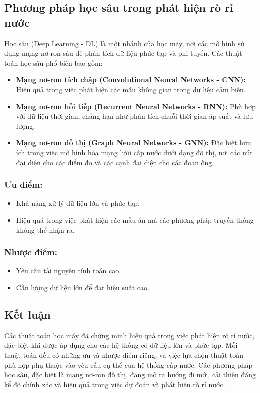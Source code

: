 \subsection{Phương pháp học sâu trong phát hiện rò rỉ nước}
Học sâu (Deep Learning - DL) là một nhánh của học máy, nơi các mô hình sử dụng mạng nơ-ron sâu để phân tích dữ liệu phức tạp và phi tuyến. Các thuật toán học sâu phổ biến bao gồm:
\begin{itemize}
    \item \textbf{Mạng nơ-ron tích chập (Convolutional Neural Networks - CNN):} Hiệu quả trong việc phát hiện các mẫu không gian trong dữ liệu cảm biến.
    \item \textbf{Mạng nơ-ron hồi tiếp (Recurrent Neural Networks - RNN):} Phù hợp với dữ liệu thời gian, chẳng hạn như phân tích chuỗi thời gian áp suất và lưu lượng.
    \item \textbf{Mạng nơ-ron đồ thị (Graph Neural Networks - GNN):} Đặc biệt hữu ích trong việc mô hình hóa mạng lưới cấp nước dưới dạng đồ thị, nơi các nút đại diện cho các điểm đo và các cạnh đại diện cho các đoạn ống.
\end{itemize}

\subsubsection{Ưu điểm:}
\begin{itemize}
    \item Khả năng xử lý dữ liệu lớn và phức tạp.
    \item Hiệu quả trong việc phát hiện các mẫu ẩn mà các phương pháp truyền thống không thể nhận ra.
\end{itemize}

\subsubsection{Nhược điểm:}
\begin{itemize}
    \item Yêu cầu tài nguyên tính toán cao.
    \item Cần lượng dữ liệu lớn để đạt hiệu suất cao.
\end{itemize}

\subsection{Kết luận}
Các thuật toán học máy đã chứng minh hiệu quả trong việc phát hiện rò rỉ nước, đặc biệt khi được áp dụng cho các hệ thống có dữ liệu lớn và phức tạp. Mỗi thuật toán đều có những ưu và nhược điểm riêng, và việc lựa chọn thuật toán phù hợp phụ thuộc vào yêu cầu cụ thể của hệ thống cấp nước. Các phương pháp học sâu, đặc biệt là mạng nơ-ron đồ thị, đang mở ra hướng đi mới, cải thiện đáng kể độ chính xác và hiệu quả trong việc dự đoán và phát hiện rò rỉ nước.


